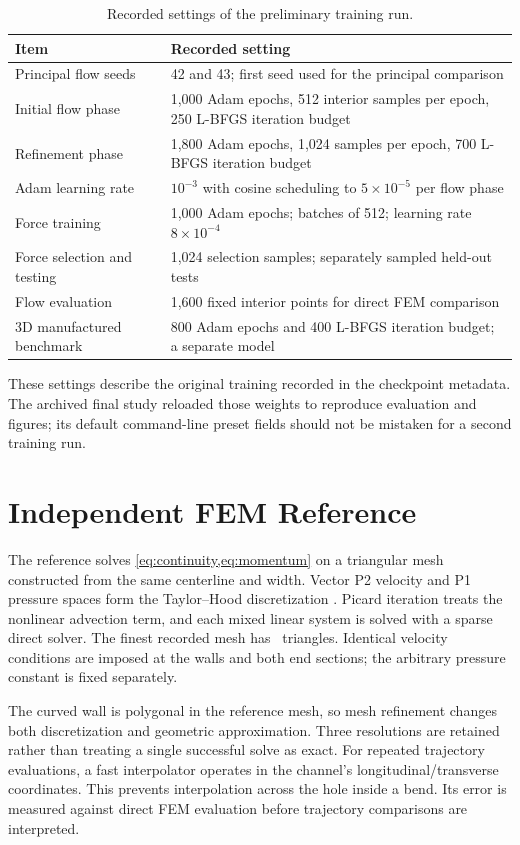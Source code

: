 \begin{table}[!htbp]
\centering\small
\caption{Recorded settings of the preliminary training run.}
\label{tab:training}
\begin{tabularx}{\textwidth}{@{}lY@{}}
\toprule Item & Recorded setting\\\midrule
Principal flow seeds & 42 and 43; first seed used for the principal comparison\\
Initial flow phase & 1,000 Adam epochs, 512 interior samples per epoch, 250 L-BFGS iteration budget\\
Refinement phase & 1,800 Adam epochs, 1,024 samples per epoch, 700 L-BFGS iteration budget\\
Adam learning rate & $10^{-3}$ with cosine scheduling to $5\times10^{-5}$ per flow phase\\
Force training & 1,000 Adam epochs; batches of 512; learning rate $8\times10^{-4}$\\
Force selection and testing & 1,024 selection samples; separately sampled held-out tests\\
Flow evaluation & 1,600 fixed interior points for direct FEM comparison\\
3D manufactured benchmark & 800 Adam epochs and 400 L-BFGS iteration budget; a separate model\\
\bottomrule
\end{tabularx}
\end{table}
These settings describe the original training recorded in the checkpoint
metadata. The archived final study reloaded those weights to reproduce
evaluation and figures; its default command-line preset fields should not
be mistaken for a second training run.

\section{Independent FEM Reference}
The reference solves \cref{eq:continuity,eq:momentum} on a triangular mesh
constructed from the same centerline and width. Vector P2 velocity and P1
pressure spaces form the Taylor--Hood discretization
\cite{taylor1973,gustafsson2020}. Picard iteration treats the nonlinear
advection term, and each mixed linear system is solved with a sparse direct
solver. The finest recorded mesh has \FinestTriangles\ triangles. Identical
velocity conditions are imposed at the walls and both end sections; the
arbitrary pressure constant is fixed separately.

The curved wall is polygonal in the reference mesh, so mesh refinement
changes both discretization and geometric approximation. Three resolutions
are retained rather than treating a single successful solve as exact.
For repeated trajectory evaluations, a fast interpolator operates in the
channel's longitudinal/transverse coordinates. This prevents interpolation
across the hole inside a bend. Its error is measured against direct FEM
evaluation before trajectory comparisons are interpreted.


